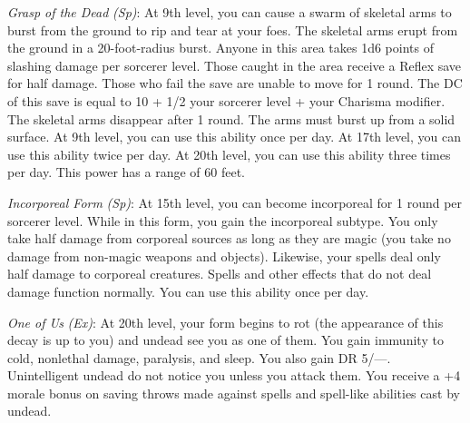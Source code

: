 \textit{Grasp of the Dead} \textit{(Sp)}: At 9th level, you can cause a swarm of skeletal arms to burst from the ground to rip and tear at your foes. The skeletal arms erupt from the ground in a 20-foot-radius burst. Anyone in this area takes 1d6 points of slashing damage per sorcerer level. Those caught in the area receive a Reflex save for half damage. Those who fail the save are unable to move for 1 round. The DC of this save is equal to 10 + 1/2 your sorcerer level + your Charisma modifier. The skeletal arms disappear after 1 round. The arms must burst up from a solid surface. At 9th level, you can use this ability once per day. At 17th level, you can use this ability twice per day. At 20th level, you can use this ability three times per day. This power has a range of 60 feet.
				
\textit{Incorporeal Form} \textit{(Sp)}: At 15th level, you can become incorporeal for 1 round per sorcerer level. While in this form, you gain the incorporeal subtype. You only take half damage from corporeal sources as long as they are magic (you take no damage from non-magic weapons and objects). Likewise, your spells deal only half damage to corporeal creatures. Spells and other effects that do not deal damage function normally. You can use this ability once per day.
				
\textit{One of Us} \textit{(Ex)}: At 20th level, your form begins to rot (the appearance of this decay is up to you) and undead see you as one of them. You gain immunity to cold, nonlethal damage, paralysis, and sleep. You also gain DR 5/---. Unintelligent undead do not notice you unless you attack them. You receive a +4 morale bonus on saving throws made against spells and spell-like abilities cast by undead.
	
